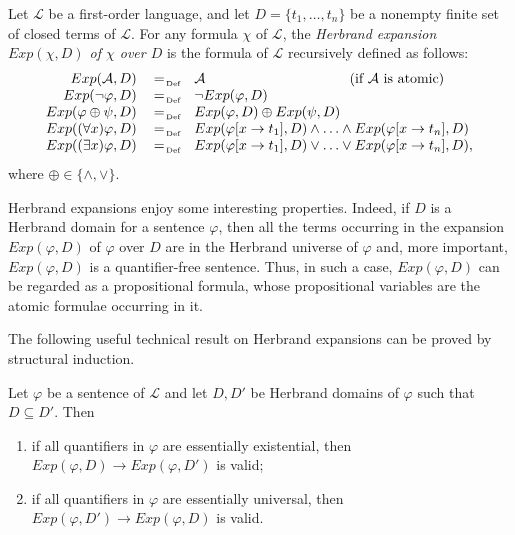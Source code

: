 \documentclass[manyauthors]{fundam}
\newcommand{\Lang}{\ensuremath{\mathcal{L}\xspace}} %
\newcommand{\HExp}{Exp}
\newcommand{\subst}[3]{#1[#2\rightarrow#3]}
\begin{document}
\begin{definition}\label{EXP}
Let $\Lang$ be a first-order language, and let $D=\{t_1, \ldots, 
t_n\}$ be a nonempty finite set of closed terms of $\Lang$. For any 
formula $\chi$ of $\Lang$, the \emph{Herbrand expansion  $\HExp(\chi, 
D)$ of $\chi$ over $D$} is the formula of $\Lang$ recursively defined 
as follows:
\[
  \begin{array}{rcll}
  \HExp(\mathcal{A}, D) & \defAs & 
\mathcal{A}\qquad\qquad\qquad\qquad~\qquad\text{(if $\mathcal{A}$ is 
atomic)}  \\
  \HExp(\neg \varphi, D) & \defAs & \neg\HExp(\varphi, D) \\
  \HExp(\varphi \oplus \psi, D) & \defAs & \HExp(\varphi, D) \oplus 
\HExp(\psi, D)\\
  \HExp((\forall x)\varphi, D) & \defAs & 
\HExp(\subst{\varphi}{x}{t_1}, D) \wedge \ldots \wedge 
\HExp(\subst{\varphi}{x}{t_n}, D)\\
  \HExp((\exists x)\varphi, D) & \defAs & \HExp(\subst{\varphi}{x}{t_1}, D) \vee 
\ldots \vee \HExp(\subst{\varphi}{x}{t_n}, D),\\
  \end{array}
\]
where $\oplus \in \{\wedge, \vee\}$.%
\end{definition}

Herbrand expansions enjoy some interesting properties. Indeed, if $D$ 
is a Herbrand domain for a sentence $\varphi$, then all the terms 
occurring in the expansion $\HExp(\varphi, D)$ of
$\varphi$ over $D$ are in the Herbrand universe of $\varphi$ and, more
important, $\HExp(\varphi, D)$ is a
quantifier-free sentence.
Thus, in such a case, $\HExp(\varphi, D)$ can be regarded as a propositional
formula, whose propositional variables are the atomic formulae occurring in it.

The following useful technical result on Herbrand expansions can be 
proved by structural induction.
\begin{lemma}\label{le:Exp}
Let $\varphi$ be a sentence of $\Lang$ and let $D, D'$ be Herbrand 
domains of $\varphi$ such that $D \subseteq D'$. Then
\begin{enumerate}[label=(\alph*)]
\item\label{le:Expa} if all quantifiers in $\varphi$ are essentially 
existential, then $\HExp(\varphi, D) \rightarrow \HExp(\varphi, D')$ 
is valid;

\item\label{le:Expb} if all quantifiers in $\varphi$ are essentially 
universal, then $\HExp(\varphi, D') \rightarrow \HExp(\varphi, D)$ is 
valid.%
\end{enumerate}
\end{lemma}
\end{document}
